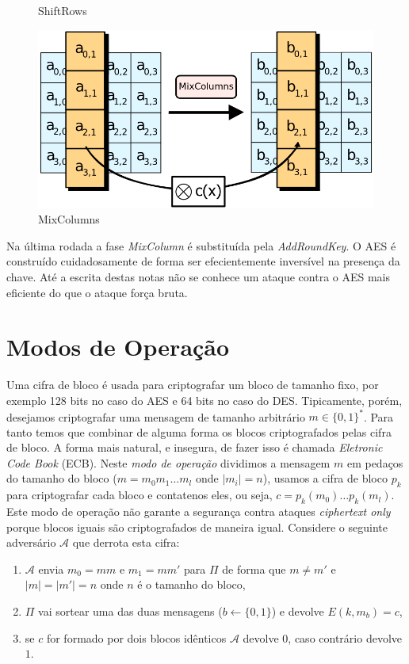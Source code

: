 \begin{figure}[!htp]
\begin{minipage}{.4\textwidth}
    \caption{ShiftRows}
    \label{fig:add-round-key}
  \end{minipage}
 \begin{minipage}{.4\textwidth}
    \centering
    \includegraphics[width=\textwidth]{imagens/MixColumns.png}
    \caption{MixColumns}
    \label{fig:mix-columns}
  \end{minipage}
\end{figure}

Na última rodada a fase {\em MixColumn} é substituída pela {\em AddRoundKey}.
O AES é construído cuidadosamente de forma ser efecientemente inversível na presença da chave.
Até a escrita destas notas não se conhece um ataque contra o AES mais eficiente do que o ataque força bruta.


\section{Modos de Operação}
\label{sec:modos-de-operacao-bloco}

Uma cifra de bloco é usada para criptografar um bloco de tamanho fixo, por exemplo 128 bits no caso do AES e 64 bits no caso do DES.
Tipicamente, porém, desejamos criptografar uma mensagem de tamanho arbitrário $m \in \{0,1\}^*$.
Para tanto temos que combinar de alguma forma os blocos criptografados pelas cifra de bloco.
A forma mais natural, e insegura, de fazer isso é chamada {\em Eletronic Code Book} (ECB).
Neste {\em modo de operação} dividimos a mensagem $m$ em pedaços do tamanho do bloco ($m = m_0 m_1 \dots m_l$ onde $|m_i| = n$), usamos a cifra de bloco $p_k$ para criptografar cada bloco e contatenos eles, ou seja, $c = p_k(m_0) \dots p_k(m_l)$.
Este modo de operação não garante a segurança contra ataques {\em ciphertext only} porque blocos iguais são criptografados de maneira igual.
Considere o seguinte adversário $\mathcal{A}$ que derrota esta cifra:
\begin{enumerate}
\item $\mathcal{A}$ envia $m_0 = mm$ e $m_1=mm'$ para $\Pi$ de forma que $m \neq m'$ e $|m| = |m'| = n$ onde $n$ é o tamanho do bloco,
\item $\Pi$ vai sortear uma das duas mensagens ($b \leftarrow \{0,1\}$) e devolve $E(k, m_b) =c$,
\item se $c$ for formado por dois blocos idênticos $\mathcal{A}$ devolve $0$, caso contrário devolve $1$.
\end{enumerate}

